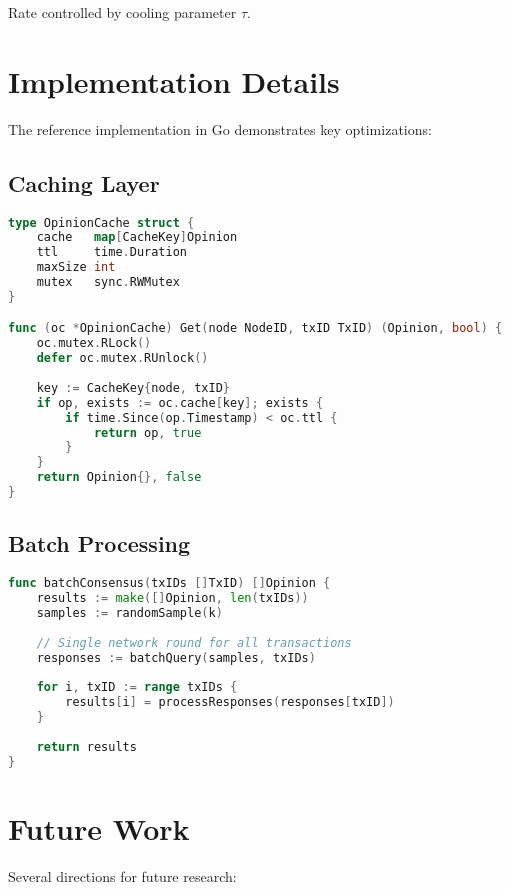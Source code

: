 \documentclass[11pt,a4paper]{article}
\begin{document}
Rate controlled by cooling parameter $\tau$.

\section{Implementation Details}
\label{sec:implementation}

The reference implementation in Go demonstrates key optimizations:

\subsection{Caching Layer}

\begin{lstlisting}[language=Go, caption=Opinion caching for performance]
type OpinionCache struct {
    cache   map[CacheKey]Opinion
    ttl     time.Duration
    maxSize int
    mutex   sync.RWMutex
}

func (oc *OpinionCache) Get(node NodeID, txID TxID) (Opinion, bool) {
    oc.mutex.RLock()
    defer oc.mutex.RUnlock()
    
    key := CacheKey{node, txID}
    if op, exists := oc.cache[key]; exists {
        if time.Since(op.Timestamp) < oc.ttl {
            return op, true
        }
    }
    return Opinion{}, false
}
\end{lstlisting}

\subsection{Batch Processing}

\begin{lstlisting}[language=Go, caption=Batch consensus for multiple transactions]
func batchConsensus(txIDs []TxID) []Opinion {
    results := make([]Opinion, len(txIDs))
    samples := randomSample(k)
    
    // Single network round for all transactions
    responses := batchQuery(samples, txIDs)
    
    for i, txID := range txIDs {
        results[i] = processResponses(responses[txID])
    }
    
    return results
}
\end{lstlisting}

\section{Future Work}
\label{sec:future}

Several directions for future research:
\end{document}
